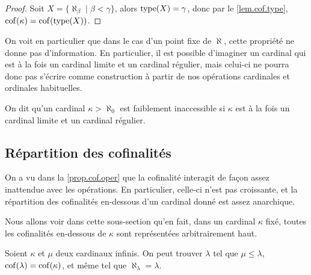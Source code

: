 \begin{proof}
  Soit $X = \{\aleph_\beta \mid \beta < \gamma\}$, alors $\operatorname{type}(X) = \gamma$,
  donc par le \cref{lem.cof.type}, $\operatorname{cof}(\kappa) = \operatorname{cof}(\operatorname{type}(X))$.
\end{proof}

On voit en particulier que dans le cas d'un point fixe de $\aleph$, cette
propriété ne donne pas d'information. En particulier, il est possible d'imaginer
un cardinal qui est à la fois un cardinal limite et un cardinal régulier, mais
celui-ci ne pourra donc pas s'écrire comme construction à partir de nos
opérations cardinales et ordinales habituelles.

\begin{definition}
  On dit qu'un cardinal $\kappa > \aleph_0$ est faiblement inaccessible si
  $\kappa$ est à la fois un cardinal limite et un cardinal régulier.
\end{definition}

\subsection{Répartition des cofinalités}

On a vu dans la \cref{prop.cof.oper} que la cofinalité interagit de façon assez
inattendue avec les opérations. En particulier, celle-ci n'est pas croissante,
et la répartition des cofinalités en-dessous d'un cardinal donné est assez
anarchique.

Nous allons voir dans cette sous-section qu'en fait, dans un cardinal $\kappa$
fixé, toutes les cofinalités en-dessous de $\kappa$ sont représentées
arbitrairement haut.

\begin{proposition}
  Soient $\kappa$ et $\mu$ deux cardinaux infinis. On peut trouver $\lambda$ tel
  que $\mu \leq \lambda$, $\operatorname{cof}(\lambda) = \operatorname{cof}(\kappa)$, et même tel que
  $\aleph_\lambda = \lambda$.
\end{proposition}

